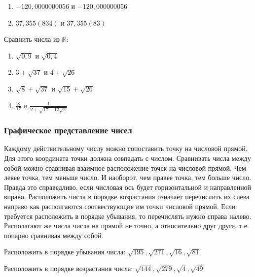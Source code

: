 \documentclass[algebra,twocolumn]{pum}
\begin{document}
\begin{exercises}
\begin{question}
\begin{enumerate}[nosep]
        \item $-120,0000000056$ и $-120,000000056$
        \item $37,355(834)$ и $37,355(83)$
      \end{enumerate}
  \end{question}
  \begin{question}
    Сравнить числа из $\mathbb{R}$:
      \begin{enumerate}
        \item $\sqrt{0,9}$ и $\sqrt{0,4}$
        \item $3+\sqrt{37}$ и $4+\sqrt{26}$
        \item $\sqrt{8}+\sqrt{37}$ и $\sqrt{15}+\sqrt{26}$
        \item $\frac{8}{17}$ и $\frac{1}{2+\sqrt{17-12\sqrt{2}}}$
      \end{enumerate}
  \end{question}
\end{exercises}

\subsubsection*{Графическое представление чисел}

Каждому действительному числу можно сопоставить точку на числовой прямой. Для этого координата точки должна совпадать с числом. Сравнивать числа между собой можно сравнивая взаимное расположение точек на числовой прямой. Чем левее точка, тем меньше число. И наоборот, чем правее точка, тем больше число. Правда это справедливо, если числовая ось будет горизонтальной и направленной вправо. Расположить числа в порядке возрастания означает перечислить их слева направо как располгаются соотвествующие им точки числовой прямой. Если требуется расположить в порядке убывания, то перечислять нужно справа налево. Располагают же числа числа на прямой не точно, а относительно друг друга, т.е. попарно сравнивая между собой.

\begin{exercises}
\begin{question}
  Расположить в порядке убывания числа: $\sqrt{195},\sqrt{271},\sqrt{16},\sqrt{81}$
\end{question}
\begin{question}
  Расположить в порядке возрастания числа: $\sqrt{144},\sqrt{279},\sqrt{4},\sqrt{49}$
\end{question}
\end{exercises}
\end{document}
